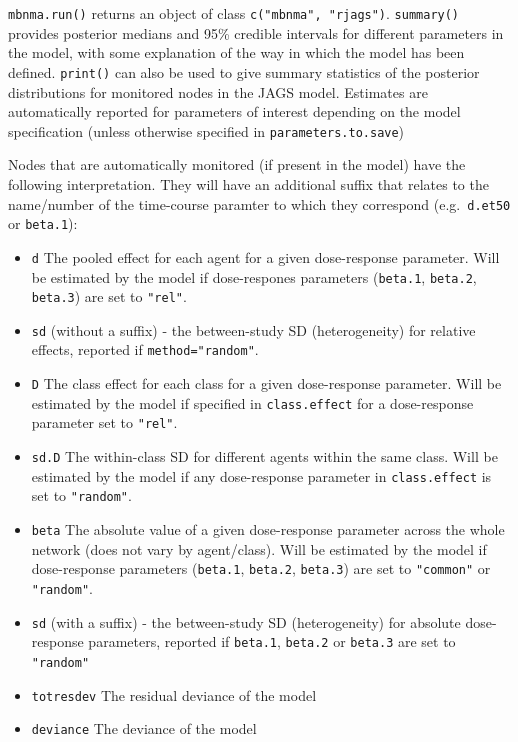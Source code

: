 \documentclass[]{article}
\providecommand{\tightlist}{%
  \setlength{\itemsep}{0pt}\setlength{\parskip}{0pt}}
\begin{document}
\texttt{mbnma.run()} returns an object of class
\texttt{c("mbnma",\ "rjags")}. \texttt{summary()} provides posterior
medians and 95\% credible intervals for different parameters in the
model, with some explanation of the way in which the model has been
defined. \texttt{print()} can also be used to give summary statistics of
the posterior distributions for monitored nodes in the JAGS model.
Estimates are automatically reported for parameters of interest
depending on the model specification (unless otherwise specified in
\texttt{parameters.to.save})

Nodes that are automatically monitored (if present in the model) have
the following interpretation. They will have an additional suffix that
relates to the name/number of the time-course paramter to which they
correspond (e.g.~\texttt{d.et50} or \texttt{beta.1}):

\begin{itemize}
\tightlist
\item
  \texttt{d} The pooled effect for each agent for a given dose-response
  parameter. Will be estimated by the model if dose-respones parameters
  (\texttt{beta.1}, \texttt{beta.2}, \texttt{beta.3}) are set to
  \texttt{"rel"}.
\item
  \texttt{sd} (without a suffix) - the between-study SD (heterogeneity)
  for relative effects, reported if \texttt{method="random"}.
\item
  \texttt{D} The class effect for each class for a given dose-response
  parameter. Will be estimated by the model if specified in
  \texttt{class.effect} for a dose-response parameter set to
  \texttt{"rel"}.
\item
  \texttt{sd.D} The within-class SD for different agents within the same
  class. Will be estimated by the model if any dose-response parameter
  in \texttt{class.effect} is set to \texttt{"random"}.
\item
  \texttt{beta} The absolute value of a given dose-response parameter
  across the whole network (does not vary by agent/class). Will be
  estimated by the model if dose-response parameters (\texttt{beta.1},
  \texttt{beta.2}, \texttt{beta.3}) are set to \texttt{"common"} or
  \texttt{"random"}.
\item
  \texttt{sd} (with a suffix) - the between-study SD (heterogeneity) for
  absolute dose-response parameters, reported if \texttt{beta.1},
  \texttt{beta.2} or \texttt{beta.3} are set to \texttt{"random"}
\item
  \texttt{totresdev} The residual deviance of the model
\item
  \texttt{deviance} The deviance of the model
\end{itemize}
\end{document}
